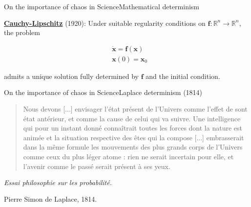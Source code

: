 \documentclass[usenames, dvipsnames, aspectratio=169]{beamer}
\begin{document}
\begin{frame}[t, c]{On the importance of chaos in Science}{Mathematical determinism}
  \vfill
  \large

  \underline{\textbf{Cauchy-Lipschitz}} (1920): Under suitable regularity conditions on $\bm{f} : \mathbb{R}^n \to \mathbb{R}^n$, the problem

  \[
  \begin{aligned}
    & \dot{\bm{x}} = \bm{f}(\bm{x}) \\
    & \bm{x}(0) = \bm{x}_0
  \end{aligned}
  \]

  \bigskip

  admits a unique solution fully determined by $\bm{f}$ and the initial condition.

  \vfill
\end{frame}

\begin{frame}[t, c]{On the importance of chaos in Science}{Laplace determinism (1814)}
  \vfill
  \large

  \begin{quote}
    Nous devons [...] envisager l'état présent de l'Univers comme l'effet de sont état antérieur, et comme la cause de celui qui va suivre.
    Une intelligence qui pour un instant donné connaîtrait toutes les forces dont la nature est animée et la situation respective des êtes qui la compose [...] embrasserait dans la même formule les mouvements des plus grands corps de l'Univers comme ceux du plus léger atome : rien ne serait incertain pour elle, et l'avenir comme le passé serait présent à ses yeux.
  \end{quote}
  \begin{flushright}
    \emph{Essai philosophie sur les probabilité.}

    Pierre Simon de Laplace, 1814.
  \end{flushright}

  \vfill
\end{frame}
\end{document}
